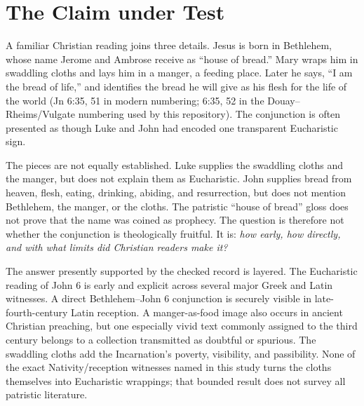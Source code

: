 
\section{The Claim under Test}

A familiar Christian reading joins three details. Jesus is born in Bethlehem,
whose name Jerome and Ambrose receive as ``house of bread.'' Mary wraps him in
swaddling cloths and lays him in a manger, a feeding place. Later he says, ``I
am the bread of life,'' and identifies the bread he will give as his flesh for
the life of the world (Jn 6:35, 51 in modern numbering; 6:35, 52 in the
Douay--Rheims/Vulgate numbering used by this repository). The conjunction is often presented as
though Luke and John had encoded one transparent Eucharistic sign.

The pieces are not equally established. Luke supplies the swaddling cloths and
the manger, but does not explain them as Eucharistic. John supplies bread from
heaven, flesh, eating, drinking, abiding, and resurrection, but does not mention
Bethlehem, the manger, or the cloths. The patristic ``house of bread'' gloss
does not prove that the name was coined as prophecy. The question is therefore not
whether the conjunction is theologically fruitful. It is: \emph{how early, how
directly, and with what limits did Christian readers make it?}

The answer presently supported by the checked record is layered. The
Eucharistic reading of John 6 is early and explicit across several major Greek
and Latin witnesses. A direct
Bethlehem--John 6 conjunction is securely visible in late-fourth-century Latin
reception. A manger-as-food image also occurs in ancient Christian preaching,
but one especially vivid text commonly assigned to the third century belongs
to a collection transmitted as doubtful or spurious. The swaddling cloths add
the Incarnation's poverty, visibility, and passibility. None of the exact
Nativity/reception witnesses named in this study turns the cloths themselves
into Eucharistic wrappings; that bounded result does not survey all patristic
literature.

